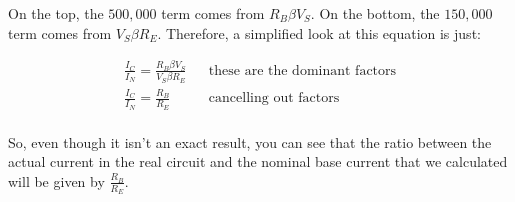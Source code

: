 On the top, the $500,000$ term comes from $R_B \beta V_S$.
On the bottom, the $150,000$ term comes from $V_S \beta R_E$.
Therefore, a simplified look at this equation is just:

\begin{align*}
\frac{I_C}{I_N} = \frac{R_B \beta V_S}{V_S \beta R_E} && \textrm{these are the dominant factors} \\
\frac{I_C}{I_N} = \frac{R_B}{R_E} && \textrm{cancelling out factors} \\
\end{align*}

So, even though it isn't an exact result, you can see that the ratio between the actual current in the real circuit and the nominal base current that we calculated will be given by $\frac{R_B}{R_E}$.
